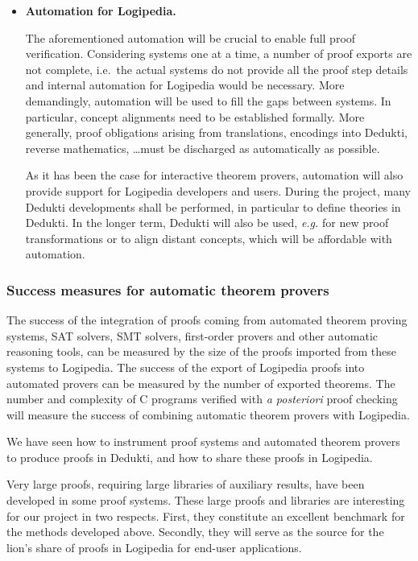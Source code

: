 \begin{itemize}
\item{\bf Automation for Logipedia.}

  The aforementioned automation will be crucial to enable full proof
verification. Considering systems one at a time, a number of proof
exports are not complete, i.e.~the actual systems do not provide
all the proof step details and internal automation for Logipedia would be
necessary. More demandingly, automation will be used to fill the gaps
between systems. In particular, concept alignments need to be established
formally. More generally, proof obligations arising from translations,
encodings into Dedukti, reverse mathematics, \dots must be discharged
as automatically as possible.

As it has been the case for interactive theorem provers, automation
will also provide support for Logipedia developers and users. During
the project, many Dedukti developments shall be performed, in
particular to define theories in Dedukti. In the longer term, Dedukti
will also be used, {\em e.g.} for new proof transformations or to
align distant concepts, which will be affordable with automation.
\end{itemize}

\subsubsection*{Success measures for automatic theorem provers}

The success of the integration of proofs coming from automated theorem
proving systems, SAT solvers, SMT solvers, first-order provers and other
automatic reasoning tools, can be
measured by the size of the proofs imported from these systems to Logipedia.
%
The success of the export of Logipedia proofs into automated provers can
be measured by the number of exported theorems.
%
The number and complexity of C programs verified with {\em a posteriori}
proof checking will measure the success of combining automatic theorem provers with Logipedia.


We have seen how to instrument proof systems and automated theorem
provers to produce proofs in Dedukti, and how to share these proofs in
Logipedia.

Very large proofs, requiring large libraries of auxiliary results,
have been developed in some proof systems. These large proofs and
libraries are interesting for our project in two respects. First, they
constitute an excellent benchmark for the methods developed
above. Secondly, they will serve as the source for the lion's share of
proofs in Logipedia for end-user applications.

